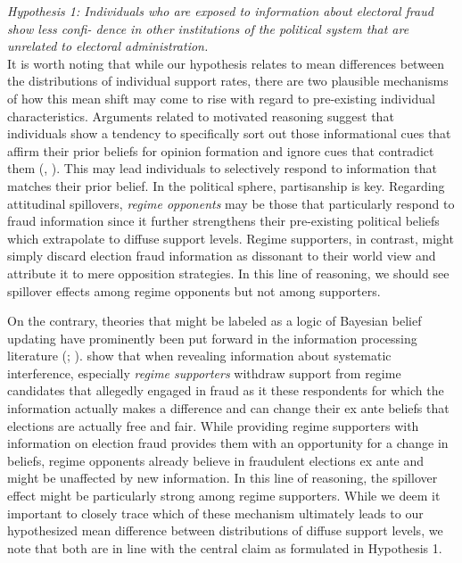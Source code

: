 \documentclass[11pt, ngerman,english,a4]{article}
\begin{document}
\indent \textit{Hypothesis 1: Individuals who are exposed to information about electoral fraud show less confi- \indent dence in other institutions of the political system that are unrelated to electoral administration.} \\

It is worth noting that while our hypothesis relates to mean differences between the distributions of individual support rates, there are two plausible mechanisms of how this mean shift may come to rise with regard to pre-existing individual characteristics. Arguments related to motivated reasoning suggest that individuals show a tendency to specifically sort out those informational cues that affirm their prior beliefs for opinion formation and ignore cues that contradict them (\citealt{Robertson2017}, \citealt{Bush2018}). This may lead individuals to selectively respond to information that matches their prior belief. In the political sphere, partisanship is key. Regarding attitudinal spillovers, \textit{regime opponents} may be those that particularly respond to fraud information since it further strengthens their pre-existing political beliefs which extrapolate to diffuse support levels. Regime supporters, in contrast, might simply discard election fraud information as dissonant to their world view and attribute it to mere opposition strategies. In this line of reasoning, we should see spillover effects among regime opponents but not among supporters. 

On the contrary, theories that might be labeled as a logic of Bayesian belief updating have prominently been put forward in the information processing literature (\citealt{Bullock2009}; \citealt{Hill2017}). \citet{Reuter2019} show that when revealing information about systematic interference, especially \textit{regime supporters} withdraw support from regime candidates that allegedly engaged in fraud as it these respondents for which the information actually makes a difference and can change their ex ante beliefs that elections are actually free and fair. While providing regime supporters with information on election fraud provides them with an opportunity for a change in beliefs, regime opponents already believe in fraudulent elections ex ante and might be unaffected by new information. In this line of reasoning, the spillover effect might be particularly strong among regime supporters. While we deem it important to closely trace which of these mechanism ultimately leads to our hypothesized mean difference between distributions of diffuse support levels, we note that both are in line with the central claim as formulated in Hypothesis 1. 
\end{document}
